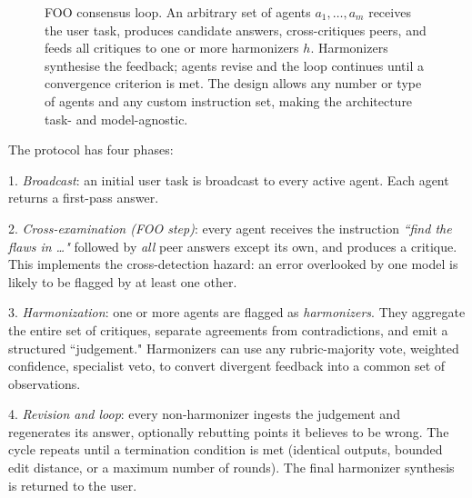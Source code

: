\documentclass[12pt]{article}
\theoremstyle{definition}
\begin{document}
\begin{figure}[htbp]

    \caption{FOO consensus loop.  
             An arbitrary set of agents \(a_{1},\dots,a_{m}\) receives
             the user task, produces candidate answers, cross-critiques
             peers, and feeds all critiques to one or more harmonizers
             \(h\).  Harmonizers synthesise the feedback; agents revise
             and the loop continues until a convergence criterion is
             met.  The design allows any number or type of agents and
             any custom instruction set, making the architecture task-
             and model-agnostic.}
    \label{fig:consensus-flow}
\end{figure}

The protocol has four phases:

1. \emph{Broadcast}: an initial user task is broadcast to every
   active agent.  Each agent returns a first-pass answer.

2. \emph{Cross-examination (FOO step)}: every agent receives the instruction
   \emph{``find the flaws in …"} followed by \emph{all} peer answers
   except its own, and produces a critique.  
   This implements the cross-detection hazard: an error overlooked by
   one model is likely to be flagged by at least one other.

3. \emph{Harmonization}: one or more agents are flagged as
   \emph{harmonizers}.  They aggregate the entire set of critiques,
   separate agreements from contradictions, and emit a structured
   ``judgement."  Harmonizers can use any rubric-majority vote, weighted
   confidence, specialist veto, to convert divergent feedback into a
   common set of observations.

4. \emph{Revision and loop}: every non-harmonizer ingests the judgement and
   regenerates its answer, optionally rebutting points it believes to be
   wrong.  The cycle repeats until a termination condition is met
   (identical outputs, bounded edit distance, or a maximum number of
   rounds).  The final harmonizer synthesis is returned to the user.
\end{document}
